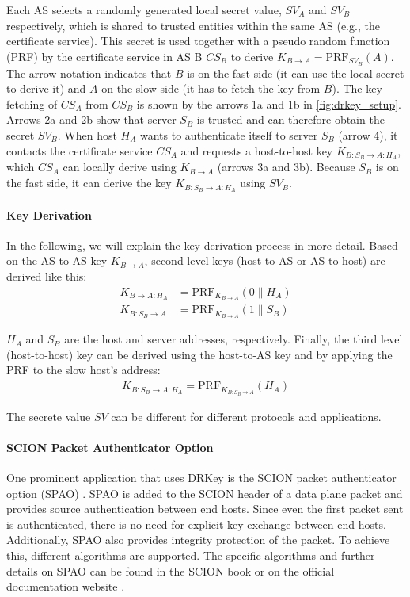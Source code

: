 Each AS selects a randomly generated local secret value, $SV_A$ and $SV_B$ respectively, which is shared to trusted entities within the same AS (e.g., the certificate service).
This secret is used together with a pseudo random function (PRF) by the certificate service in AS B $CS_B$ to derive $K_{B \rightarrow A} = \text{PRF}_{SV_B}(A)$.
The arrow notation indicates that $B$ is on the fast side (it can use the local secret to derive it) and $A$ on the slow side (it has to fetch the key from $B$).
The key fetching of $CS_A$ from $CS_B$ is shown by the arrows 1a and 1b in \cref{fig:drkey_setup}.
Arrows 2a and 2b show that server $S_B$ is trusted and can therefore obtain the secret $SV_B$.
When host $H_A$ wants to authenticate itself to server $S_B$ (arrow 4), it contacts the certificate service $CS_A$ and requests a host-to-host key $K_{B:S_B \rightarrow A:H_A}$, which $CS_A$ can locally derive using $K_{B \rightarrow A}$ (arrows 3a and 3b).
Because $S_B$ is on the fast side, it can derive the key $K_{B:S_B \rightarrow A:H_A}$ using $SV_B$.

\paragraph{Key Derivation}
In the following, we will explain the key derivation process in more detail.
Based on the AS-to-AS key $K_{B \rightarrow A}$, second level keys (host-to-AS or AS-to-host) are derived like this:
\begin{align*}
K_{B \rightarrow A:H_A} &= \text{PRF}_{K_{B \rightarrow A}}(0 \parallel H_A) \\
K_{B:S_B \rightarrow A} &= \text{PRF}_{K_{B \rightarrow A}}(1 \parallel S_B)
\end{align*}

$H_A$ and $S_B$ are the host and server addresses, respectively.
Finally, the third level (host-to-host) key can be derived using the host-to-AS key and by applying the PRF to the slow host's address:
\begin{align*}
    K_{B:S_B \rightarrow A:H_A} = \text{PRF}_{K_{B:S_B \rightarrow A}}(H_A)
\end{align*}

The secrete value $SV$ can be different for different protocols and applications.

\paragraph{SCION Packet Authenticator Option}
\label{sec:spao}
One prominent application that uses DRKey is the SCION packet authenticator option (SPAO) \cite[Section 3.3]{Perrig2022}.
SPAO is added to the SCION header of a data plane packet and provides source authentication between end hosts.
Since even the first packet sent is authenticated, there is no need for explicit key exchange between end hosts.
Additionally, SPAO also provides integrity protection of the packet.
To achieve this, different algorithms are supported.
The specific algorithms and further details on SPAO can be found in the SCION book or on the official documentation website \cite{anapayaSCIONPacket}.

